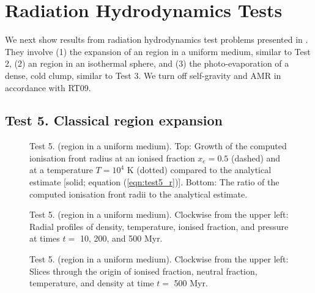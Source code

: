 \documentclass[useAMS,usenatbib]{mn2e}
\begin{document}
\section{Radiation Hydrodynamics Tests}
\label{sec:radhydro}

We next show results from radiation hydrodynamics test problems
presented in \citet[][hereafter RT09]{Iliev09}.  They involve (1) the
expansion of an \hii region in a uniform medium, similar to Test 2,
(2) an \hii region in an isothermal sphere, and (3) the
photo-evaporation of a dense, cold clump, similar to Test 3.  We turn
off self-gravity and AMR in accordance with RT09.

\subsection{Test 5. Classical \hii region expansion}
\label{sec:test5}

\begin{figure}
  \caption{\label{fig:test5_1} Test 5. (\hii region in a uniform
    medium).  Top: Growth of the computed ionisation front radius at
    an ionised fraction $x_e = 0.5$ (dashed) and at a temperature $T =
    10^4$ K (dotted) compared to the analytical estimate [solid;
    equation (\ref{eqn:test5_r})].  Bottom: The ratio of the computed
    ionisation front radii to the analytical estimate.} 
\end{figure}

\begin{figure}
  \caption{\label{fig:test5_2} Test 5. (\hii region in a uniform
    medium).  Clockwise from the upper left: Radial profiles of
    density, temperature, ionised fraction, and pressure at times $t
    =$ 10, 200, and 500 Myr.}
\end{figure}

\begin{figure*}
  \caption{\label{fig:test5_3} Test 5. (\hii region in a uniform
    medium).  Clockwise from the upper left: Slices through the origin
    of ionised fraction, neutral fraction, temperature, and density at
    time $t =$ 500 Myr.}
\end{figure*}
\end{document}
